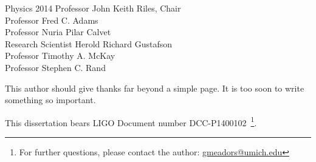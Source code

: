 \documentclass[leqno,twoside]{report}
\theoremstyle{plain}
\theoremstyle{definition}
\theoremstyle{remark}
\numberwithin{theorem}{chapter}        %
\begin{document}





{Physics} {2014}
{ Professor John Keith Riles, Chair \\
  Professor Fred C. Adams\\
  Professor Nuria Pilar Calvet\\
  Research Scientist Herold Richard Gustafson\\
  Professor Timothy A. McKay\\
  Professor Stephen C. Rand
 }



\initializefrontsections

{}

\setcounter{page}{1}


\startacknowledgementspage

This author should give thanks far beyond a simple page. It is too soon to write something so important.

This dissertation bears LIGO Document number DCC-P1400102~\footnote{For further questions, please contact the author: \href{mailto:gmeadors@umich.edu}{gmeadors@umich.edu}}.



\tableofcontents
\listoffigures
\listoftables
\listofappendices


\startthechapters 
\end{document}
